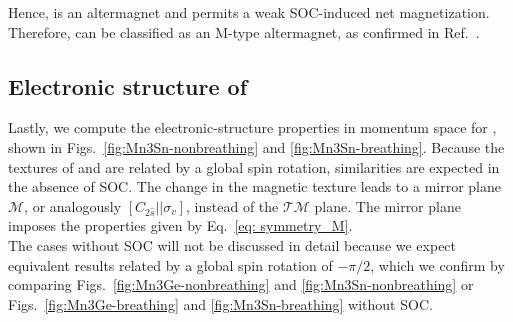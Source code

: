 Hence,  is an altermagnet and permits a weak SOC-induced net magnetization. Therefore,  can be classified as an M-type altermagnet, as confirmed in Ref.~\cite{Cheong2025}.



\subsection{Electronic structure of }
Lastly, we compute the electronic-structure properties in momentum space for , shown in Figs.~\ref{fig:Mn3Sn-nonbreathing} and \ref{fig:Mn3Sn-breathing}.
Because the textures of  and  are related by a global spin rotation, similarities are expected in the absence of SOC. The change in the magnetic texture leads to a mirror plane $\mathcal{M}$, or analogously $[C_{2\hat{s}}||\sigma_v]$, instead of the $\mathcal{TM}$ plane. The mirror plane imposes the properties given by Eq.~\eqref{eq: symmetry_M}.\\ 
The cases without SOC will not be discussed in detail because we expect equivalent results related by a global spin rotation of $-\pi/2$, which we confirm by comparing Figs.~\ref{fig:Mn3Ge-nonbreathing} and \ref{fig:Mn3Sn-nonbreathing} or Figs.~\ref{fig:Mn3Ge-breathing} and \ref{fig:Mn3Sn-breathing} without SOC. \\




